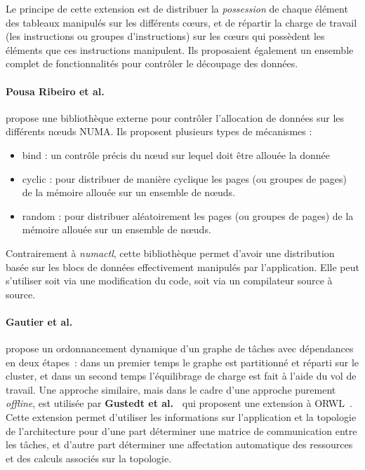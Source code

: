 Le principe de cette extension est de distribuer la \emph{possession} de chaque élément des tableaux manipulés sur les différents cœurs, et de répartir la charge de travail (les instructions ou groupes d'instructions) sur les cœurs qui possèdent les éléments que ces instructions manipulent.
Ils proposaient également un ensemble complet de fonctionnalités pour contrôler le découpage des données.

\paragraph{Pousa Ribeiro et al.~\cite{Pousa2009}} propose une bibliothèque externe pour contrôler l'allocation de données sur les différents nœuds NUMA.
Ils proposent plusieurs types de mécanismes :
\begin{itemize}
  \item bind : un contrôle précis du nœud sur lequel doit être allouée la donnée
  \item cyclic : pour distribuer de manière cyclique les pages (ou groupes de pages) de la mémoire allouée sur un ensemble de nœuds.
  \item random : pour distribuer aléatoirement les pages (ou groupes de pages) de la mémoire allouée sur un ensemble de nœuds.
\end{itemize}

Contrairement à \emph{numactl}, cette bibliothèque permet d'avoir une distribution basée sur les blocs de données effectivement manipulés par l'application.
Elle peut s'utiliser soit via une modification du code, soit via un compilateur source à source.

\paragraph{Gautier et al.~\cite{Gautier2007}} propose un ordonnancement dynamique d'un graphe de tâches avec dépendances en deux étapes~: dans un premier temps le graphe est partitionné et réparti sur le cluster, et dans un second temps l'équilibrage de charge est fait à l'aide du vol de travail.
Une approche similaire, mais dans le cadre d'une approche purement \emph{offline}, est utilisée par \textbf{Gustedt et al.~\cite{Gustedt2017}} qui proposent une extension à ORWL~\cite{Clauss2010}.
Cette extension permet d'utiliser les informations sur l'application et la topologie de l'architecture pour d'une part déterminer une matrice de communication entre les tâches, et d'autre part déterminer une affectation automatique des ressources et des calculs associés sur la topologie.



